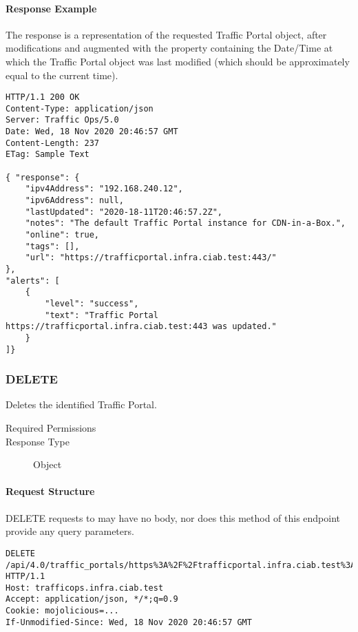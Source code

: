 \paragraph{Response Example}
The response is a representation of the requested Traffic Portal object, after
modifications and augmented with the  property containing the
Date/Time at which the Traffic Portal object was last modified (which should be
approximately equal to the current time).

\begin{codelisting}
\begin{verbatim}
HTTP/1.1 200 OK
Content-Type: application/json
Server: Traffic Ops/5.0
Date: Wed, 18 Nov 2020 20:46:57 GMT
Content-Length: 237
ETag: Sample Text

{ "response": {
	"ipv4Address": "192.168.240.12",
	"ipv6Address": null,
	"lastUpdated": "2020-18-11T20:46:57.2Z",
	"notes": "The default Traffic Portal instance for CDN-in-a-Box.",
	"online": true,
	"tags": [],
	"url": "https://trafficportal.infra.ciab.test:443/"
},
"alerts": [
	{
		"level": "success",
		"text": "Traffic Portal https://trafficportal.infra.ciab.test:443 was updated."
	}
]}
\end{verbatim}
\end{codelisting}

\subsubsection{DELETE}
Deletes the identified Traffic Portal.

\begin{description}
	\item[Required Permissions] 
	\item[Response Type] Object
\end{description}

\paragraph{Request Structure}
DELETE requests to  may have no body, nor
does this method of this endpoint provide any query parameters.

\begin{codelisting}
\begin{verbatim}
DELETE /api/4.0/traffic_portals/https%3A%2F%2Ftrafficportal.infra.ciab.test%3A443 HTTP/1.1
Host: trafficops.infra.ciab.test
Accept: application/json, */*;q=0.9
Cookie: mojolicious=...
If-Unmodified-Since: Wed, 18 Nov 2020 20:46:57 GMT

\end{verbatim}
\end{codelisting}

